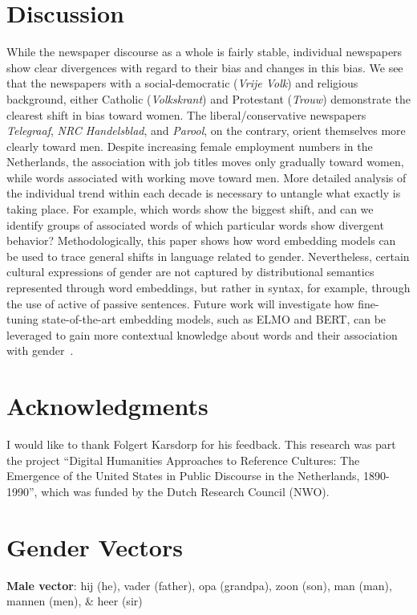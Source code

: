 \documentclass[11pt,a4paper]{article}
\begin{document}
\section{Discussion}
While the newspaper discourse as a whole is fairly stable, individual newspapers show clear divergences with regard to their bias and changes in this bias. We see that the newspapers with a social-democratic (\textit{Vrije Volk}) and religious background, either Catholic (\textit{Volkskrant}) and Protestant (\textit{Trouw}) demonstrate the clearest shift in bias toward women. The liberal/conservative newspapers \textit{Telegraaf}, \textit{NRC Handelsblad}, and \textit{Parool}, on the contrary, orient themselves more clearly toward men. 
Despite increasing female employment numbers in the Netherlands, the association with job titles moves only gradually toward women, while words associated with working move toward men. 
More detailed analysis of the individual trend within each decade is necessary to untangle what exactly is taking place. For example, which words show the biggest shift, and can we identify groups of associated words of which particular words show divergent behavior?
Methodologically, this paper shows how word embedding models can be used to trace general shifts in language related to gender. Nevertheless, certain cultural expressions of gender are not captured by distributional semantics represented through word embeddings, but rather in syntax, for example, through the use of active of passive sentences. Future work will investigate how fine-tuning state-of-the-art embedding models, such as ELMO and BERT, can be leveraged to gain more contextual knowledge about words and their association with gender~\cite{peters_deep_2018}.  

\section*{Acknowledgments}
I would like to thank Folgert Karsdorp for his feedback. This research was part the project ``Digital Humanities Approaches to Reference Cultures: The Emergence of the United States in Public Discourse in the Netherlands, 1890-1990'', which was funded by the Dutch Research Council (NWO).\\






\clearpage

\appendix
\section{Gender Vectors}
\textbf{Male vector}: hij (he), vader (father), opa (grandpa), zoon (son), man (man), mannen (men), \& heer (sir)
\end{document}
